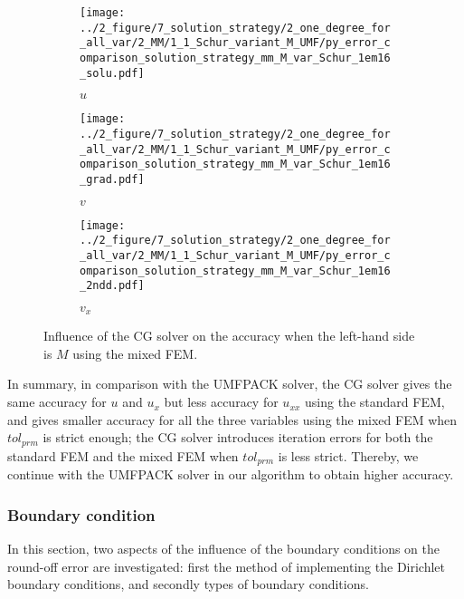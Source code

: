 \documentclass[review,3p]{elsarticle}
\begin{document}
\begin{figure}[!ht]
    \begin{subfigure}{5.5cm}
        \texttt{[image: ../2\_figure/7\_solution\_strategy/2\_one\_degree\_for\_all\_var/2\_MM/1\_1\_Schur\_variant\_M\_UMF/py\_error\_comparison\_solution\_strategy\_mm\_M\_var\_Schur\_1em16\_solu.pdf]}
        \caption{$u$}
        \label{py_bench_Pois_MM_error_solution_strategy_schur_1em16_M_variant_solu}
    \end{subfigure}
    \hspace{-0.2cm}
    \begin{subfigure}{5.5cm}
        \texttt{[image: ../2\_figure/7\_solution\_strategy/2\_one\_degree\_for\_all\_var/2\_MM/1\_1\_Schur\_variant\_M\_UMF/py\_error\_comparison\_solution\_strategy\_mm\_M\_var\_Schur\_1em16\_grad.pdf]}
        \caption{$v$}
        \label{py_bench_Pois_MM_error_solution_strategy_schur_1em16_M_variant_grad}
    \end{subfigure}
    \hspace{-0.2cm}
    \begin{subfigure}{5.5cm}
        \texttt{[image: ../2\_figure/7\_solution\_strategy/2\_one\_degree\_for\_all\_var/2\_MM/1\_1\_Schur\_variant\_M\_UMF/py\_error\_comparison\_solution\_strategy\_mm\_M\_var\_Schur\_1em16\_2ndd.pdf]}
        \caption{$v_x$}
        \label{py_bench_Pois_MM_error_solution_strategy_schur_1em16_M_variant_2ndd}
    \end{subfigure}
\caption{Influence of the CG solver on the accuracy when the left-hand side is $M$ using the mixed FEM.}
\label{py_bench_Pois_MM_error_solution_strategy_schur_1em16_M_variant}
\end{figure}

In summary, in comparison with the UMFPACK solver, the CG solver gives the same accuracy for $u$ and $u_{x}$ but less accuracy for $u_{xx}$ using the standard FEM, and gives smaller accuracy for all the three variables using the mixed FEM when $tol_{prm}$ is strict enough; the CG solver introduces iteration errors for both the standard FEM and the mixed FEM when $tol_{prm}$ is less strict. Thereby, we continue with the UMFPACK solver in our algorithm to obtain higher accuracy.

\subsubsection{Boundary condition}	\label{section_sensitivity_BC}

In this section, two aspects of the influence of the boundary conditions on the round-off error are investigated: first the method of implementing the Dirichlet boundary conditions, and secondly types of boundary conditions. 
\end{document}
